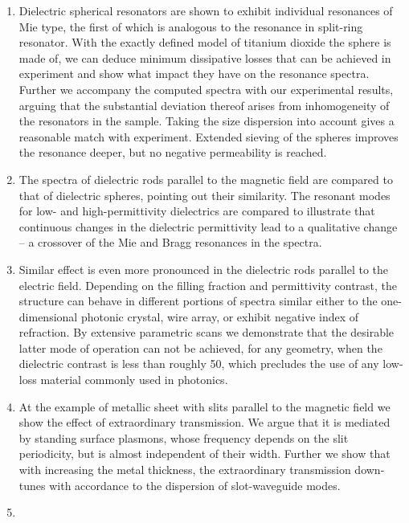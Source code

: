 \begin{enumerate}
{} 
\item{Dielectric spherical resonators are shown to exhibit individual resonances of Mie type, the first of which is analogous to the resonance in split-ring resonator. With the exactly defined model of titanium dioxide the sphere is made of, we can deduce minimum dissipative losses that can be achieved in experiment and show what impact they have on the resonance spectra. Further we accompany the computed spectra with our experimental results, arguing that the substantial deviation thereof arises from inhomogeneity of the resonators in the sample. Taking the size dispersion into account gives a reasonable match with experiment. Extended sieving of the spheres improves the resonance deeper, but no negative permeability is reached.
} 
\item{The spectra of dielectric rods parallel to the magnetic field are compared to that of dielectric spheres, pointing out their similarity. The resonant modes for low- and high-permittivity dielectrics are compared to illustrate that continuous changes in the dielectric permittivity lead to a qualitative change -- a crossover of the Mie and Bragg resonances in the spectra.
} 
\item{Similar effect is even more pronounced in the dielectric rods parallel to the electric field. Depending on the filling fraction and permittivity contrast, the structure can behave in different portions of spectra similar either to the one-dimensional photonic crystal, wire array, or exhibit negative index of refraction. By extensive parametric scans we demonstrate that the desirable latter mode of operation  can not be achieved, for any geometry, when the dielectric contrast is less than roughly 50, which precludes the use of any low-loss material commonly used in photonics. 
} 
\item{At the example of metallic sheet with slits parallel to the magnetic field we show the effect of extraordinary transmission. We argue that it is mediated by standing surface plasmons, whose frequency depends on the slit periodicity, but is almost independent of their width. Further we show that with increasing the metal thickness, the extraordinary transmission down-tunes with accordance to the dispersion of slot-waveguide modes.
} 
\item{%
}
\end{enumerate}

